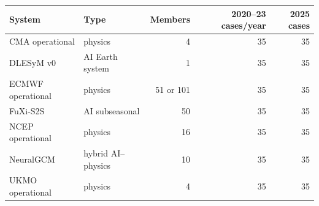 \begin{tabular}{llrrr}
\toprule
System & Type & Members & 2020--23 cases/year & 2025 cases \\
\midrule
CMA operational & physics & 4 & 35 & 35 \\
DLESyM v0 & AI Earth system & 1 & 35 & 35 \\
ECMWF operational & physics & 51 or 101 & 35 & 35 \\
FuXi-S2S & AI subseasonal & 50 & 35 & 35 \\
NCEP operational & physics & 16 & 35 & 35 \\
NeuralGCM & hybrid AI--physics & 10 & 35 & 35 \\
UKMO operational & physics & 4 & 35 & 35 \\
\bottomrule
\end{tabular}
